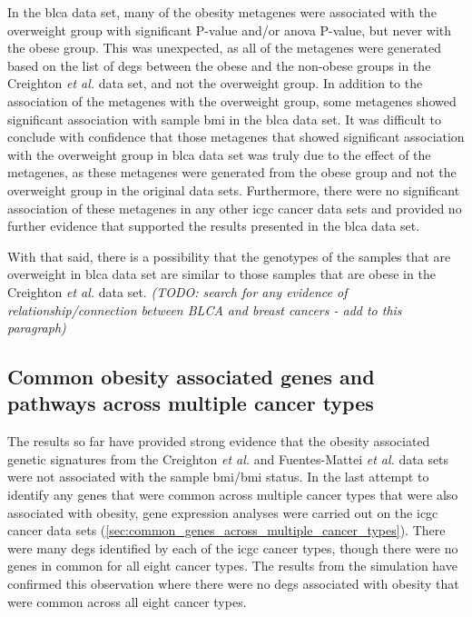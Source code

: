 In the \gls{blca} data set, many of the obesity metagenes were associated with the overweight group with significant P-value and/or \gls{anova} P-value, but never with the obese group.
This was unexpected, as all of the metagenes were generated based on the list of \glspl{deg} between the obese and the non-obese groups in the Creighton \textit{et al.} data set, and not the overweight group.
In addition to the association of the metagenes with the overweight group, some metagenes showed significant association with sample \gls{bmi} in the \gls{blca} data set.
It was difficult to conclude with confidence that those metagenes that showed significant association with the overweight group in \gls{blca} data set was truly due to the effect of the metagenes, as these metagenes were generated from the obese group and not the overweight group in the original data sets.
Furthermore, there were no significant association of these metagenes in any other \gls{icgc} cancer data sets and provided no further evidence that supported the results presented in the \gls{blca} data set.

With that said, there is a possibility that the genotypes of the samples that are overweight in \gls{blca} data set are similar to those samples that are obese in the Creighton \textit{et al.} data set.
\textit{(TODO: search for any evidence of relationship/connection between BLCA and breast cancers - add to this paragraph)}

\subsection{Common obesity associated genes and pathways across multiple cancer types}
\label{sub:common_obesity_associated_genes_and_pathways_across_multiple_cancer_types}

The results so far have provided strong evidence that the obesity associated genetic signatures from the Creighton \textit{et al.} and Fuentes-Mattei \textit{et al.} data sets were not associated with the sample \gls{bmi}/\gls{bmi} status.
In the last attempt to identify any genes that were common across multiple cancer types that were also associated with obesity, gene expression analyses were carried out on the \gls{icgc} cancer data sets (\cref{sec:common_genes_across_multiple_cancer_types}).
There were many \glspl{deg} identified by each of the \gls{icgc} cancer types, though there were no genes in common for all eight cancer types.
The results from the simulation have confirmed this observation where there were no \glspl{deg} associated with obesity that were common across all eight cancer types.

